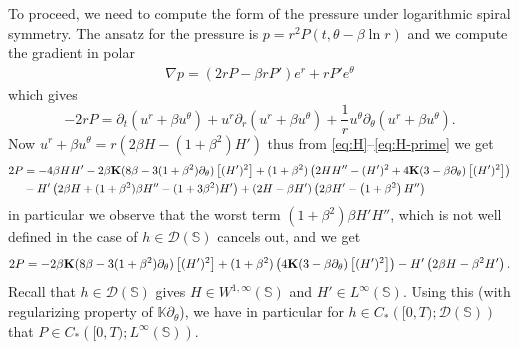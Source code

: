 \documentclass[10pt]{article}
\theoremstyle{definition}
\theoremstyle{remark}
\numberwithin{equation}{section}
\newcommand{\rd}{\partial}
\newcommand{\nb}{\nabla}
\newcommand{\0}{\emptyset}
\newcommand{\bt}{\beta}
\newcommand{\tht}{\theta}
\newcommand{\bfK}{{\bf K}}
\newcommand{\bbK}{\mathbb K}
\newcommand{\bbS}{\mathbb S}
\newcommand{\calD}{\mathcal D}
\begin{document}
 
 To proceed, we need to compute the form of the pressure under logarithmic spiral symmetry. The ansatz for the pressure is $p= r^2 P(t,\tht-\bt\ln r)$ and we  compute the gradient in polar \begin{equation*}
	    \begin{split}
	        \nb p = (2rP-\beta r P') e^{r} +  r P'  e^{\tht}
	    \end{split}
	\end{equation*} which gives 
 \[ -2rP=\partial_t \left(u^r+\beta u^\theta\right)+u^r\partial_r\left(u^r+\beta u^\theta\right)+\frac{1}{r}u^\theta \partial_\theta \left(u^r+\beta u^\theta\right).
 \]
 Now $u^r+\beta u^\theta=r\left(2\beta H-(1+\beta^2) H' \right)$ thus from \eqref{eq:H}--\eqref{eq:H-prime} we get
 \begin{align*}2P&=-4\beta H H' -2\beta\bfK(8\bt - 3(1+\bt^2)\rd_\tht)\left[ (H' )^2  \right]+(1+\beta^2)\left( 2H H''- (H' )^2 + 4 \bfK (3-\bt\rd_\tht)\left[ (H' )^2 \right]\right)\\
&-H'  \left(2\beta H+(1+\beta^2)\beta H'' -(1+3\beta^2)H' \right)+\left(2H-\beta H' \right)\left(2\beta  H' -\left(1+\beta^2\right) H''\right)\end{align*}
in particular we observe that the worst term $(1+\beta^2)\beta  H' H''$, which is not well defined in the case of $h\in \mathcal{D}\left(\mathbb{S}\right)$ cancels out, and we get
\[2P=-2\beta\bfK(8\bt - 3(1+\bt^2)\rd_\tht)\left[ ( H' )^2  \right]+(1+\beta^2)\left( 4 \bfK (3-\bt\rd_\tht)\left[ ( H' )^2 \right]\right)
     - H'  \left(2\beta H-\beta^2 H' \right).\] Recall that $h \in \calD(\bbS)$ gives $H \in W^{1,\infty}(\bbS)$ and $H' \in L^\infty(\bbS)$. Using this (with regularizing property of $\bbK \rd_\tht$), we have in particular for $h\in C_*\left([0,T);\mathcal{D}\left(\mathbb{S}\right)\right)$ that $P\in C_*\left([0,T);L^\infty\left(\mathbb{S}\right)\right)$.

\medskip 
\end{document}
